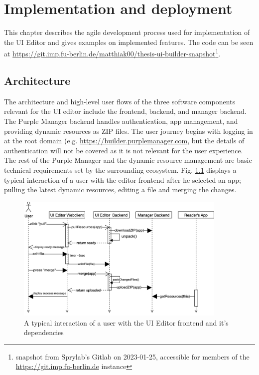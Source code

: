 
%
\chapter{Implementation and deployment}
\label{chap:impl} 

This chapter describes the agile development process used for implementation of the UI Editor and gives examples on implemented features. The code can be seen at \url{https://git.imp.fu-berlin.de/matthiak00/thesis-ui-builder-snapshot}\footnote{snapshot from Sprylab's Gitlab on 2023-01-25, accessible for members of the \url{https://git.imp.fu-berlin.de} instance}.


\section{Architecture}

The architecture and high-level user flows of the three software components relevant for the UI editor include the frontend, backend, and \Gls{manager} backend. The Purple Manager backend handles authentication, app management, and providing dynamic resources as ZIP files. The user journey begins with logging in at the root domain (e.g. \url{https://builder.purplemanager.com}, but the details of authentication will not be covered as it is not relevant for the user experience. The \Gls{rest} of the Purple Manager and the dynamic resource management are basic technical requirements set by the surrounding ecosystem.
Fig. \ref{fig:userflow} displays a typical interaction of a user with the editor frontend after he selected an app; pulling the latest dynamic resources, editing a file and merging the changes.
\begin{figure}[h!]
  \centering
  \includegraphics[width=0.9\textwidth]{pics/user-flow.uml.drawio.png}
  \caption{A typical interaction of a user with the UI Editor frontend and it's dependencies}
  \label{fig:userflow}
\end{figure}
\pagebreak
